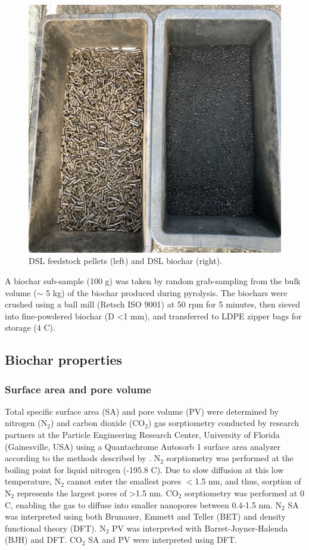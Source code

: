 \begin{figure}
    \centering
    \includegraphics[width=0.5\linewidth,scale=0.6]{Bilder/Pyrolysis/Pellets.png}
    \caption{DSL feedstock pellets (left) and DSL biochar (right).}
    \label{fig:pellets}
\end{figure}

A biochar sub-sample (100 g) was taken by random grab-sampling from the bulk volume ($\sim$ 5 kg) of the biochar produced during pyrolysis. The biochars were crushed using a ball mill (Retsch ISO 9001) at 50 rpm for 5 minutes, then sieved into fine-powdered biochar (D \textless 1 mm), and transferred to LDPE zipper bags for storage (4 \textdegree C). 

\subsection{Biochar properties}
\subsubsection{Surface area and pore volume}
Total specific surface area (SA) and pore volume (PV) were determined by nitrogen ($\mathrm{N_2}$) and carbon dioxide ($\mathrm{CO_2}$) gas sorptiometry conducted by research partners at the Particle Engineering Research Center, University of Florida (Gainesville, USA) using a Quantachrome Autosorb 1 surface area analyzer according to the methods described by \cite{kwon2005}. $\mathrm{N_2}$ sorptiometry was performed at the boiling point for liquid nitrogen (-195.8 \textdegree C). Due to slow diffusion at this low temperature, $\mathrm{N_2}$ cannot enter the smallest pores $<$1.5 nm, and thus, sorption of $\mathrm{N_2}$ represents the largest pores of \textgreater 1.5 nm. $\mathrm{CO_2}$ sorptiometry was performed at 0 \textdegree C, enabling the gas to diffuse into smaller nanopores between 0.4-1.5 nm. $\mathrm{N_2}$ SA was interpreted using both Brunauer, Emmett and Teller (BET) and density functional theory (DFT). $\mathrm{N_2}$ PV was interpreted with Barret-Joyner-Halenda (BJH) and DFT. $\mathrm{CO_2}$ SA and PV were interpreted using DFT. 


